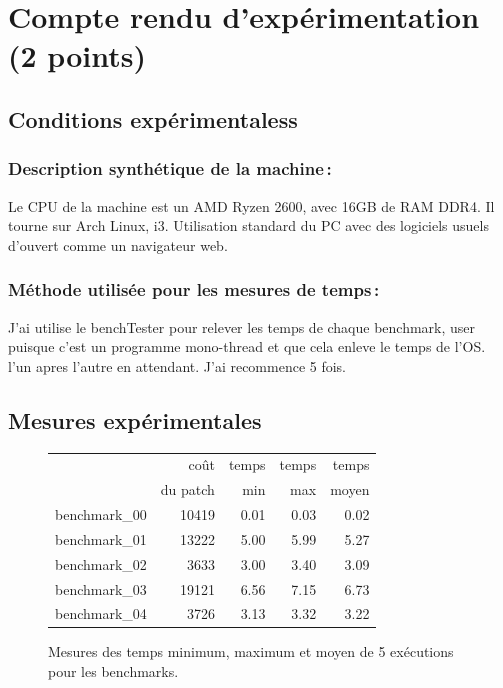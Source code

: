 \documentclass[a4paper,10pt,french]{article}
\begin{document}
\section{Compte rendu d'expérimentation (2 points)}
  \subsection{Conditions expérimentaless}

    \subsubsection{Description synthétique de la machine\,:}
	Le CPU de la machine est un AMD Ryzen 2600, avec 16GB de RAM DDR4. Il tourne sur Arch Linux, i3. Utilisation standard du PC avec des logiciels usuels d'ouvert comme un navigateur web.

    \subsubsection{Méthode utilisée pour les mesures de temps\,: }
	J'ai utilise le benchTester pour relever les temps de chaque benchmark, user puisque c'est un programme mono-thread et que cela enleve le temps de l'OS. l'un apres l'autre en attendant. J'ai recommence 5 fois.

  \subsection{Mesures expérimentales}

    \begin{figure}[h]
      \begin{center}
        \begin{tabular}{|l||r||r|r|r||}
          \hline
          \hline
            & coût         & temps     & temps   & temps \\
            & du patch     & min       & max     & moyen \\
          \hline
          \hline
		  benchmark\_00 &   10419   &  0.01 &  0.03   &  0.02   \\
          \hline
		  benchmark\_01 &   13222   &  5.00 &  5.99   &  5.27   \\
          \hline
		  benchmark\_02 &   3633    &  3.00 &  3.40   &  3.09   \\
          \hline
		  benchmark\_03 &   19121   &  6.56 &  7.15   &  6.73   \\
          \hline
		  benchmark\_04 &   3726    &  3.13 &  3.32   &  3.22   \\
          \hline
          \hline
        \end{tabular}
        \caption{Mesures des temps minimum, maximum et moyen de 5 exécutions pour les benchmarks.}
        \label{table-temps}
      \end{center}
    \end{figure}
\end{document}
